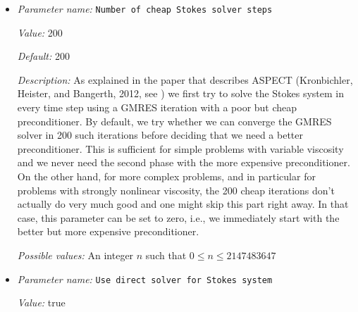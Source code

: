 \begin{itemize}
{\it Value:} 1000


{\it Default:} 1000


{\it Description:} This sets the maximum number of iterations used in the expensive Stokes solver. If this value is set too low for the size of the problem, the Stokes solver will not converge and return an error message pointing out that the user didn't allow a sufficiently large number of iterations for the iterative solver to converge.


{\it Possible values:} An integer $n$ such that $0\leq n \leq 2147483647$
\item {\it Parameter name:} {\tt Number of cheap Stokes solver steps}
\label{parameters:Solver parameters/Stokes solver parameters/Number of cheap Stokes solver steps}


{\it Value:} 200


{\it Default:} 200


{\it Description:} As explained in the paper that describes ASPECT (Kronbichler, Heister, and Bangerth, 2012, see \cite{KHB12}) we first try to solve the Stokes system in every time step using a GMRES iteration with a poor but cheap preconditioner. By default, we try whether we can converge the GMRES solver in 200 such iterations before deciding that we need a better preconditioner. This is sufficient for simple problems with variable viscosity and we never need the second phase with the more expensive preconditioner. On the other hand, for more complex problems, and in particular for problems with strongly nonlinear viscosity, the 200 cheap iterations don't actually do very much good and one might skip this part right away. In that case, this parameter can be set to zero, i.e., we immediately start with the better but more expensive preconditioner.


{\it Possible values:} An integer $n$ such that $0\leq n \leq 2147483647$
\item {\it Parameter name:} {\tt Use direct solver for Stokes system}
\label{parameters:Solver parameters/Stokes solver parameters/Use direct solver for Stokes system}


{\it Value:} true



\end{itemize}
